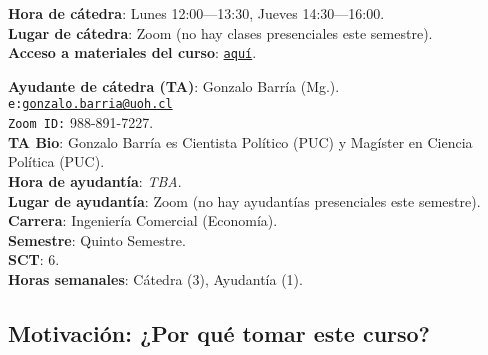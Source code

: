 \documentclass[letterpaper]{article}
\begin{document}
\vspace{5mm}
{\bf Hora de c\'atedra}: Lunes 12:00---13:30, Jueves 14:30---16:00.\\
{\bf Lugar de c\'atedra}: Zoom (no hay clases presenciales este semestre).\\

{\bf Acceso a materiales del curso}: \href{https://ucampus.uoh.cl/uoh/2021/1/ICE3201/1/}{\texttt{aqu\'i}}.

\vspace{5mm}
{\bf Ayudante de c\'atedra (TA)}: Gonzalo Barr\'ia (Mg.).\\
\texttt{e:}\href{mailto:gonzalo.barria@uoh.cl}{\texttt{gonzalo.barria@uoh.cl}}\\
\texttt{Zoom ID:} 988-891-7227.\\
{\bf TA Bio}: Gonzalo Barr\'ia es Cientista Pol\'itico (PUC) y Mag\'ister en Ciencia Pol\'itica (PUC).\\
{\bf Hora de ayudant\'ia}: \emph{TBA}.\\
{\bf Lugar de ayudant\'ia}: Zoom (no hay ayudant\'ias presenciales este semestre).\\


\vspace{5mm}
{\bf Carrera}:  Ingenier\'ia Comercial (Econom\'ia).\\
{\bf Semestre}: Quinto Semestre.\\
{\bf SCT}: 6.\\
{\bf Horas semanales}: C\'atedra (3), Ayudant\'ia  (1). \\




\subsection*{Motivaci\'on: ¿Por qu\'e tomar este curso?}
\end{document}
